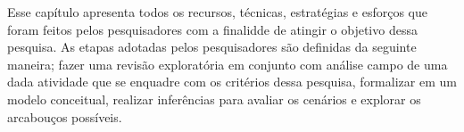 Esse capítulo apresenta todos os recursos, técnicas, estratégias e esforços que foram feitos pelos pesquisadores com a finalidde de atingir o objetivo dessa pesquisa. As etapas adotadas pelos pesquisadores são definidas da seguinte maneira; fazer uma revisão exploratória em conjunto com análise campo de uma dada atividade que se enquadre com os critérios dessa pesquisa, formalizar em um modelo conceitual, realizar inferências para avaliar os cenários e explorar os arcabouços possíveis.
